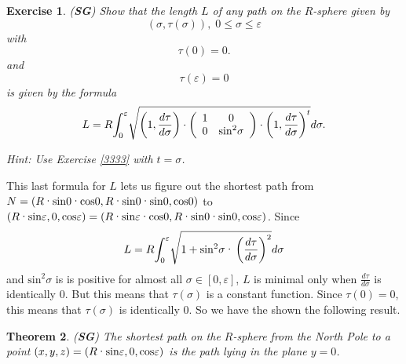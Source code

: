 \documentclass{article}%
\newtheorem{theorem}{Theorem}
\newtheorem{exercise}[theorem]{Exercise}
\begin{document}
\begin{exercise}
(\textbf{SG}) Show that the length $L$ of any path on the $R$-sphere given by%
\[
\left(  \sigma,\tau\left(  \sigma\right)  \right)  ,\;0\leq\sigma
\leq\varepsilon
\]
with%
\[
\tau\left(  0\right)  =0.
\]
and%
\[
\tau\left(  \varepsilon\right)  =0
\]
is given by the formula%
\[
L=R%
{\displaystyle\int\nolimits_{0}^{\varepsilon}}
\sqrt{\left(  1,\frac{d\tau}{d\sigma}\right)  \cdot\left(
\begin{array}
[c]{cc}%
1 & 0\\
0 & \mathrm{sin}^{2}\sigma
\end{array}
\right)  \cdot\left(  1,\frac{d\tau}{d\sigma}\right)  ^{t}}d\sigma.
\]


Hint: Use Exercise \ref{3333} with $t=\sigma$.
\end{exercise}

This last formula for $L$ lets us figure out the shortest path from $N=\left(
R\text{\textperiodcentered}\mathrm{sin}0\text{\textperiodcentered}%
\mathrm{cos}0,R\text{\textperiodcentered}\mathrm{sin}%
0\text{\textperiodcentered}\mathrm{sin}0,\mathrm{cos}0\right)  $ to $\left(
R\text{\textperiodcentered}\mathrm{sin}\varepsilon,0,\mathrm{cos}%
\varepsilon\right)  =\left(  R\text{\textperiodcentered}\mathrm{sin\varepsilon
}\text{\textperiodcentered}\mathrm{cos}0,R\text{\textperiodcentered
}\mathrm{sin}0\text{\textperiodcentered}\mathrm{sin}0,\mathrm{cos}%
\varepsilon\right)  $. Since%
\[
L=R%
{\displaystyle\int\nolimits_{0}^{\varepsilon}}
\sqrt{1+\mathrm{sin}^{2}\sigma\text{\textperiodcentered}\left(  \frac{d\tau
}{d\sigma}\right)  ^{2}}d\sigma
\]
and $\mathrm{sin}^{2}\sigma$ is is positive for almost all $\sigma\in\left[
0,\varepsilon\right]  $, $L$ is minimal only when $\frac{d\tau}{d\sigma}$ is
identically $0$. But this means that $\tau\left(  \sigma\right)  $ is a
constant function. Since $\tau\left(  0\right)  =0$, this means that
$\tau\left(  \sigma\right)  $ is identically $0$. So we have the shown the
following result.

\begin{theorem}
(\textbf{SG}) The shortest path on the $R$-sphere from the North Pole to a
point $\left(  x,y,z\right)  =\left(  R\text{\textperiodcentered}%
\mathrm{sin}\varepsilon,0,\mathrm{cos}\varepsilon\right)  $ is the path lying
in the plane $y=0$.
\end{theorem}
\end{document}
